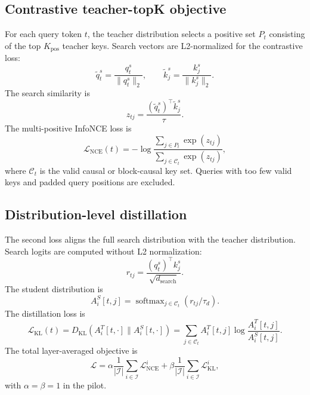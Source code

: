 \documentclass[10pt]{article}
\begin{document}
\subsection{Contrastive teacher-topK objective}
For each query token $t$, the teacher distribution selects a positive set $P_t$
consisting of the top $K_{\mathrm{pos}}$ teacher keys. Search vectors are
L2-normalized for the contrastive loss:
\begin{equation}
    \tilde{q}_t^s=\frac{q_t^s}{\|q_t^s\|_2},\qquad
    \tilde{k}_j^s=\frac{k_j^s}{\|k_j^s\|_2}.
\end{equation}
The search similarity is
\begin{equation}
    z_{tj}=\frac{(\tilde{q}_t^s)^\top \tilde{k}_j^s}{\tau}.
\end{equation}
The multi-positive InfoNCE loss is
\begin{equation}
    \mathcal{L}_{\mathrm{NCE}}(t)=
    -\log\frac{\sum_{j\in P_t}\exp(z_{tj})}
    {\sum_{j\in\mathcal{C}_t}\exp(z_{tj})},
\end{equation}
where $\mathcal{C}_t$ is the valid causal or block-causal key set. Queries with
too few valid keys and padded query positions are excluded.

\subsection{Distribution-level distillation}
The second loss aligns the full search distribution with the teacher
distribution. Search logits are computed without L2 normalization:
\begin{equation}
    r_{tj}=\frac{(q_t^s)^\top k_j^s}{\sqrt{d_{\mathrm{search}}}}.
\end{equation}
The student distribution is
\begin{equation}
    A_i^S[t,j]=\operatorname{softmax}_{j\in\mathcal{C}_t}(r_{tj}/\tau_d).
\end{equation}
The distillation loss is
\begin{equation}
    \mathcal{L}_{\mathrm{KL}}(t)=
    D_{\mathrm{KL}}(A_i^T[t,\cdot]\|A_i^S[t,\cdot])
    =\sum_{j\in\mathcal{C}_t}A_i^T[t,j]\log\frac{A_i^T[t,j]}{A_i^S[t,j]}.
\end{equation}
The total layer-averaged objective is
\begin{equation}
    \mathcal{L}=\alpha\frac{1}{|\mathcal{I}|}\sum_{i\in\mathcal{I}}\mathcal{L}_{\mathrm{NCE}}^i
    +\beta\frac{1}{|\mathcal{I}|}\sum_{i\in\mathcal{I}}\mathcal{L}_{\mathrm{KL}}^i,
\end{equation}
with $\alpha=\beta=1$ in the pilot.
\end{document}
